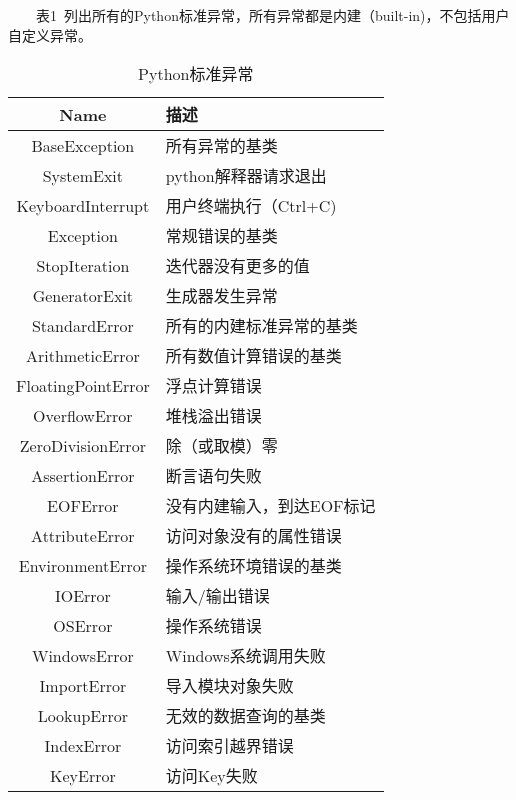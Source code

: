 \documentclass[11pt,a4paper]{article}
\begin{document}
\begin{CJK*}{UTF8}{nsung}
~~~~表1~列出所有的Python标准异常，所有异常都是内建（built-in)，不包括用户自定义异常。


\begin{table}[!hbp]
\caption{Python标准异常}
\begin{tabular}{|c|l|}
\hline
Name                              & 描述\\
\hline
BaseException                     & 所有异常的基类\\
\hline
SystemExit                        & python解释器请求退出\\
\hline
KeyboardInterrupt                 & 用户终端执行（Ctrl+C)\\
\hline
Exception                         & 常规错误的基类\\
\hline
StopIteration                     & 迭代器没有更多的值\\
\hline
GeneratorExit                     & 生成器发生异常\\
\hline
StandardError                     & 所有的内建标准异常的基类\\
\hline
ArithmeticError                   & 所有数值计算错误的基类\\
\hline
FloatingPointError                & 浮点计算错误\\
\hline
OverflowError                     & 堆栈溢出错误\\
\hline
ZeroDivisionError                 & 除（或取模）零\\
\hline
AssertionError                    & 断言语句失败\\
\hline
EOFError                          & 没有内建输入，到达EOF标记\\
\hline
AttributeError                    & 访问对象没有的属性错误\\
\hline
EnvironmentError                  & 操作系统环境错误的基类\\
\hline
IOError                           & 输入/输出错误\\
\hline
OSError                           & 操作系统错误\\
\hline
WindowsError                      & Windows系统调用失败\\
\hline
ImportError                       & 导入模块对象失败\\
\hline
LookupError                       & 无效的数据查询的基类\\
\hline
IndexError                        & 访问索引越界错误\\
\hline
KeyError                          & 访问Key失败\\

\end{tabular}
\end{table}
\end{CJK*}
\end{document}

